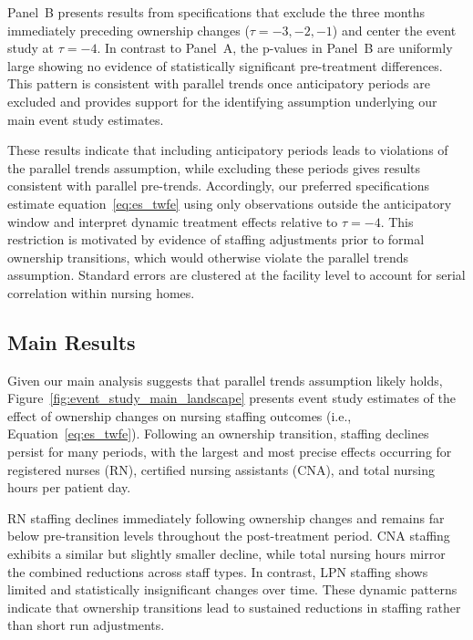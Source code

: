 \documentclass[preprint,authoryear]{elsarticle}
\begin{document}
Panel~B presents results from specifications that exclude the three months immediately preceding ownership changes ($\tau=-3,-2,-1$) and center the event study at $\tau=-4$. In contrast to Panel~A, the p-values in Panel~B are uniformly large showing no evidence of statistically significant pre-treatment differences. This pattern is consistent with parallel trends once anticipatory periods are excluded and provides support for the identifying assumption underlying our main event study estimates.

These results indicate that including anticipatory periods leads to violations of the parallel trends assumption, while excluding these periods gives results consistent with parallel pre-trends. Accordingly, our preferred specifications estimate equation~\eqref{eq:es_twfe} using only observations outside the anticipatory window and interpret dynamic treatment effects relative to $\tau=-4$. This restriction is motivated by evidence of staffing adjustments prior to formal ownership transitions, which would otherwise violate the parallel trends assumption. Standard errors are clustered at the facility level to account for serial correlation within nursing homes.

\subsection{Main Results}

Given our main analysis suggests that parallel trends assumption likely holds, Figure~\ref{fig:event_study_main_landscape} presents event study estimates of the effect of ownership changes on nursing staffing outcomes (i.e., Equation~\ref{eq:es_twfe}). Following an ownership transition, staffing declines persist for many periods, with the largest and most precise effects occurring for registered nurses (RN), certified nursing assistants (CNA), and total nursing hours per patient day.

RN staffing declines immediately following ownership changes and remains far below pre-transition levels throughout the post-treatment period. CNA staffing exhibits a similar but slightly smaller decline, while total nursing hours mirror the combined reductions across staff types. In contrast, LPN staffing shows limited and statistically insignificant changes over time. These dynamic patterns indicate that ownership transitions lead to sustained reductions in staffing rather than short run adjustments.


\end{document}
